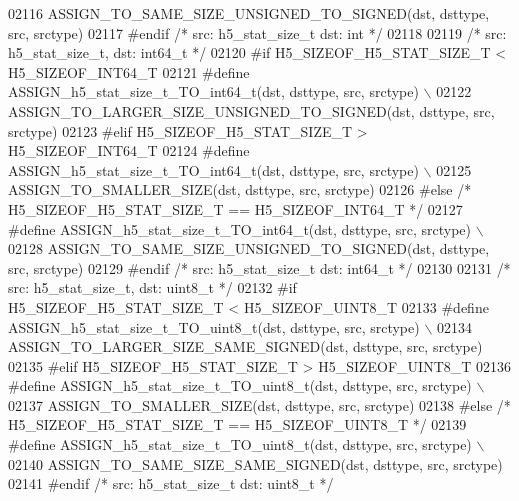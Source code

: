 \begin{DoxyCode}
02116 \textcolor{preprocessor}{        ASSIGN\_TO\_SAME\_SIZE\_UNSIGNED\_TO\_SIGNED(dst, dsttype, src, srctype)}
02117 \textcolor{preprocessor}{#endif }\textcolor{comment}{/* src: h5\_stat\_size\_t dst: int */}\textcolor{preprocessor}{}
02118 
02119 \textcolor{comment}{/* src: h5\_stat\_size\_t, dst: int64\_t */}
02120 \textcolor{preprocessor}{#if H5\_SIZEOF\_H5\_STAT\_SIZE\_T < H5\_SIZEOF\_INT64\_T}
02121 \textcolor{preprocessor}{    #define ASSIGN\_h5\_stat\_size\_t\_TO\_int64\_t(dst, dsttype, src, srctype) \(\backslash\)}
02122 \textcolor{preprocessor}{        ASSIGN\_TO\_LARGER\_SIZE\_UNSIGNED\_TO\_SIGNED(dst, dsttype, src, srctype)}
02123 \textcolor{preprocessor}{#elif H5\_SIZEOF\_H5\_STAT\_SIZE\_T > H5\_SIZEOF\_INT64\_T}
02124 \textcolor{preprocessor}{    #define ASSIGN\_h5\_stat\_size\_t\_TO\_int64\_t(dst, dsttype, src, srctype) \(\backslash\)}
02125 \textcolor{preprocessor}{        ASSIGN\_TO\_SMALLER\_SIZE(dst, dsttype, src, srctype)}
02126 \textcolor{preprocessor}{#else }\textcolor{comment}{/* H5\_SIZEOF\_H5\_STAT\_SIZE\_T == H5\_SIZEOF\_INT64\_T */}\textcolor{preprocessor}{}
02127 \textcolor{preprocessor}{    #define ASSIGN\_h5\_stat\_size\_t\_TO\_int64\_t(dst, dsttype, src, srctype) \(\backslash\)}
02128 \textcolor{preprocessor}{        ASSIGN\_TO\_SAME\_SIZE\_UNSIGNED\_TO\_SIGNED(dst, dsttype, src, srctype)}
02129 \textcolor{preprocessor}{#endif }\textcolor{comment}{/* src: h5\_stat\_size\_t dst: int64\_t */}\textcolor{preprocessor}{}
02130 
02131 \textcolor{comment}{/* src: h5\_stat\_size\_t, dst: uint8\_t */}
02132 \textcolor{preprocessor}{#if H5\_SIZEOF\_H5\_STAT\_SIZE\_T < H5\_SIZEOF\_UINT8\_T}
02133 \textcolor{preprocessor}{    #define ASSIGN\_h5\_stat\_size\_t\_TO\_uint8\_t(dst, dsttype, src, srctype) \(\backslash\)}
02134 \textcolor{preprocessor}{        ASSIGN\_TO\_LARGER\_SIZE\_SAME\_SIGNED(dst, dsttype, src, srctype)}
02135 \textcolor{preprocessor}{#elif H5\_SIZEOF\_H5\_STAT\_SIZE\_T > H5\_SIZEOF\_UINT8\_T}
02136 \textcolor{preprocessor}{    #define ASSIGN\_h5\_stat\_size\_t\_TO\_uint8\_t(dst, dsttype, src, srctype) \(\backslash\)}
02137 \textcolor{preprocessor}{        ASSIGN\_TO\_SMALLER\_SIZE(dst, dsttype, src, srctype)}
02138 \textcolor{preprocessor}{#else }\textcolor{comment}{/* H5\_SIZEOF\_H5\_STAT\_SIZE\_T == H5\_SIZEOF\_UINT8\_T */}\textcolor{preprocessor}{}
02139 \textcolor{preprocessor}{    #define ASSIGN\_h5\_stat\_size\_t\_TO\_uint8\_t(dst, dsttype, src, srctype) \(\backslash\)}
02140 \textcolor{preprocessor}{        ASSIGN\_TO\_SAME\_SIZE\_SAME\_SIGNED(dst, dsttype, src, srctype)}
02141 \textcolor{preprocessor}{#endif }\textcolor{comment}{/* src: h5\_stat\_size\_t dst: uint8\_t */}\textcolor{preprocessor}{}

\end{DoxyCode}
